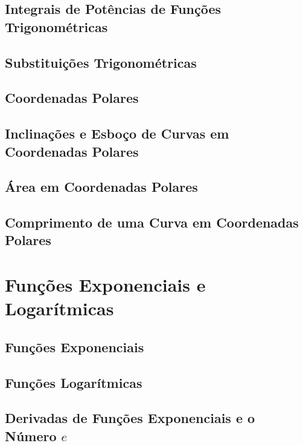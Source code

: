 \documentclass{svmono}
\begin{document}
\section{Integrais de Potências de Funções Trigonométricas}
\label{sec:intpowtrig}

\section{Substituições Trigonométricas}
\label{sec:trigsubst}

\section{Coordenadas Polares}
\label{sec:polarcoord}

\section{Inclinações e Esboço de Curvas em Coordenadas Polares}
\label{sec:polarsketch}

\section{Área em Coordenadas Polares}
\label{sec:polararea}

\section{Comprimento de uma Curva em Coordenadas Polares}
\label{sec:polarlength}

\chapterproblems

\chapter{Funções Exponenciais e Logarítmicas}
\label{chp:explog}

\section{Funções Exponenciais}
\label{sec:expfunc}

\section{Funções Logarítmicas}
\label{sec:logfunc}

\section{Derivadas de Funções Exponenciais e o Número $e$}
\label{sec:derivexp}
\end{document}
